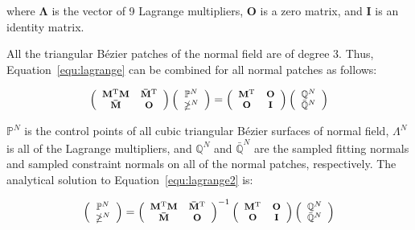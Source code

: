 \documentclass[3p]{elsarticle}
\begin{document}
\noindent where $\bm{\Lambda}$ is the vector of 9 Lagrange multipliers, $\mathbf O$ is a zero matrix, and $\mathbf I$ is
an identity matrix.

All the triangular B\'ezier patches of the normal field are of degree 3. Thus, Equation~\ref{equ:lagrange} can be
combined for all normal patches as follows:

\begin{equation}
	\footnotesize
	\left(
		\begin{array}{cc}
			\mathbf M^{\mathrm T}\mathbf M & \mathbf{\bar M}^{\mathrm T} \\
			\mathbf{\bar M} & \mathbf O
		\end{array}
	\right)
	\left(
		\begin{array}{c}
			\mathbb P^N\\
			\mathbb{\Lambda}^N
		\end{array}
	\right)
	=
	\left(
		\begin{array}{cc}
			\mathbf M^{\mathrm T}& \mathbf O\\
			\mathbf O &\mathbf I
		\end{array}
	\right)
	\left(
		\begin{array}{c}
			\mathbb Q^N\\
			\mathbb {\bar Q}^N
		\end{array}
	\right)
	\label{equ:lagrange2}
\end{equation}

$\mathbb P^N$ is the control points of all cubic triangular B\'ezier surfaces of normal field, $\mathbb \Lambda^N$ is
all of the Lagrange multipliers, and $\mathbb Q^N$ and $\mathbb{\bar Q}^N$ are the sampled fitting normals and sampled
constraint normals on all of the normal patches, respectively. The analytical solution to Equation~\ref{equ:lagrange2}
is:

\begin{equation}
	\footnotesize
	\left(
		\begin{array}{c}
			\mathbb P^N\\
			\mathbb{\Lambda}^N
		\end{array}
	\right)
	=
	\left(
		\begin{array}{cc}
			\mathbf M^{\mathrm T}\mathbf M & \mathbf{\bar M}^{\mathrm T} \\
			\mathbf{\bar M} & \mathbf O
		\end{array}
	\right)^{-1}
	\left(
		\begin{array}{cc}
			\mathbf M^{\mathrm T}& \mathbf O\\
			\mathbf O &\mathbf I
		\end{array}
	\right)
	\left(
		\begin{array}{c}
			\mathbb Q^N\\
			\mathbb {\bar Q}^N
		\end{array}
	\right)
	\label{equ:lagrange_solution}
\end{equation}
\end{document}
